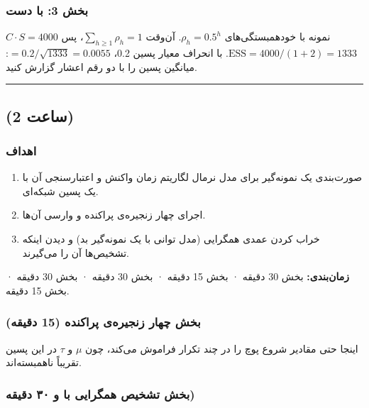 \subsubsection{\texorpdfstring{بخش 3:  با
دست}{بخش 3: ESS با دست}}

\(C \cdot S = 4000\) نمونه با خودهمبستگی‌های \(\rho_h = 0.5^h\). آن‌وقت
\(\sum_{h\ge1}\rho_h = 1\)، پس \(\mathrm{ESS} = 4000/(1 + 2) = 1333\).
با انحراف معیار پسین 0.2،  \(= 0.2/\sqrt{1333} = 0.0055\):
میانگین پسین را با دو رقم اعشار گزارش کنید.

\begin{center}\rule{0.5\linewidth}{0.5pt}\end{center}


\subsection{\texorpdfstring{ (2 ساعت)}{lab (2 ساعت)}}

\subsubsection{اهداف}

\begin{enumerate}
\def\labelenumi{\arabic{enumi}.}
\tightlist
\item
  صورت‌بندی یک نمونه‌گیر  برای مدل نرمال لگاریتم زمان واکنش و
  اعتبارسنجی آن با یک پسین شبکه‌ای.
\item
  اجرای چهار زنجیره‌ی پراکنده و وارسی آن‌ها.
\item
  خراب کردن عمدی همگرایی (مدل توانی با یک نمونه‌گیر  بد) و
  دیدن اینکه تشخیص‌ها آن را می‌گیرند.
\end{enumerate}

\textbf{زمان‌بندی:} بخش  30 دقیقه · بخش  15 دقیقه · بخش
 30 دقیقه · بخش  30 دقیقه · بخش  15 دقیقه.

\subsubsection{\texorpdfstring{بخش  چهار زنجیره‌ی پراکنده (15
دقیقه)}{بخش B: چهار زنجیره‌ی پراکنده (15 دقیقه)}}

اینجا  حتی مقادیر شروع پوچ را در چند تکرار فراموش می‌کند، چون
\(\mu\) و \(\tau\) در این پسین تقریباً ناهمبسته‌اند.

\subsubsection{\texorpdfstring{بخش تشخیص همگرایی با و ۳۰ دقیقه)}{بخش C: تشخیص همگرایی با R-hat و ESS (۳۰ دقیقه)}}

